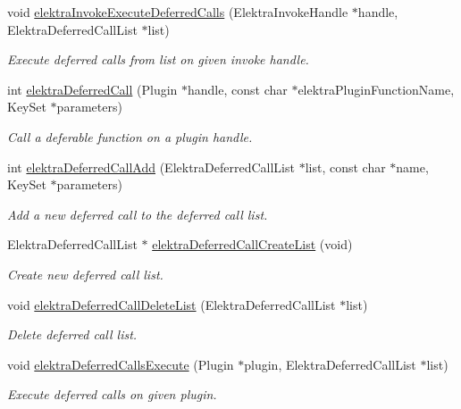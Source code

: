 \begin{DoxyCompactItemize}
void \mbox{\hyperlink{group__invoke_ga933ae8c38aadef6af1462297fcfb5041}{elektra\+Invoke\+Execute\+Deferred\+Calls}} (Elektra\+Invoke\+Handle $\ast$handle, Elektra\+Deferred\+Call\+List $\ast$list)
\begin{DoxyCompactList}\small\item\em Execute deferred calls from list on given invoke handle. \end{DoxyCompactList}\item 
int \mbox{\hyperlink{group__invoke_ga80328407d9d418af04c54ab5f10a63c0}{elektra\+Deferred\+Call}} (Plugin $\ast$handle, const char $\ast$elektra\+Plugin\+Function\+Name, Key\+Set $\ast$parameters)
\begin{DoxyCompactList}\small\item\em Call a deferable function on a plugin handle. \end{DoxyCompactList}\item 
int \mbox{\hyperlink{group__invoke_gaa6200aa148a20b58d62cd8cc73f293ce}{elektra\+Deferred\+Call\+Add}} (Elektra\+Deferred\+Call\+List $\ast$list, const char $\ast$name, Key\+Set $\ast$parameters)
\begin{DoxyCompactList}\small\item\em Add a new deferred call to the deferred call list. \end{DoxyCompactList}\item 
Elektra\+Deferred\+Call\+List $\ast$ \mbox{\hyperlink{group__invoke_gacff96e795f6fc2fad61ed2f8a5cd80cb}{elektra\+Deferred\+Call\+Create\+List}} (void)
\begin{DoxyCompactList}\small\item\em Create new deferred call list. \end{DoxyCompactList}\item 
void \mbox{\hyperlink{group__invoke_ga7b9d8b37ebd5205fded885164d3ad6b7}{elektra\+Deferred\+Call\+Delete\+List}} (Elektra\+Deferred\+Call\+List $\ast$list)
\begin{DoxyCompactList}\small\item\em Delete deferred call list. \end{DoxyCompactList}\item 
void \mbox{\hyperlink{group__invoke_gad59c673dce3c2f08fbe52c5c667f55ce}{elektra\+Deferred\+Calls\+Execute}} (Plugin $\ast$plugin, Elektra\+Deferred\+Call\+List $\ast$list)
\begin{DoxyCompactList}\small\item\em Execute deferred calls on given plugin. \end{DoxyCompactList}\end{DoxyCompactItemize}


